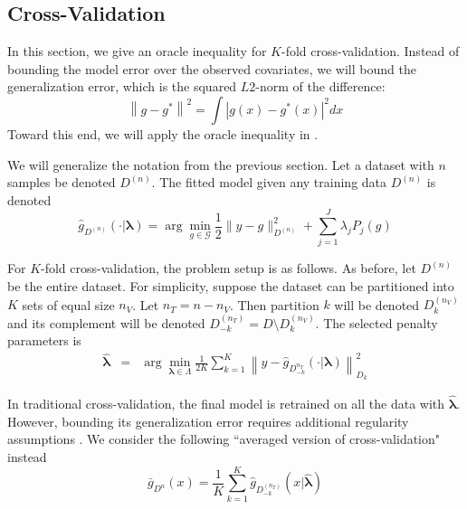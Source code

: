\documentclass[12pt]{article}
\begin{document}
\subsection{Cross-Validation}

In this section, we give an oracle inequality for $K$-fold cross-validation. Instead of bounding the model error over the observed covariates, we will bound the generalization error, which is the squared $L2$-norm of the difference:
\begin{equation}
\left \| g - g^* \right \|^2 = \int \left |g(x) - g^*(x) \right |^2 dx
\end{equation}
Toward this end, we will apply the oracle inequality in \citet{lecue2012oracle}.

We will generalize the notation from the previous section. Let a dataset with $n$ samples be denoted $D^{(n)}$. The fitted model given any training data $D^{(n)}$ is denoted
\begin{equation}
\hat{g}_{D^{(n)}}(\cdot | \boldsymbol \lambda)= \arg\min_{g\in\mathcal{G}} \frac{1}{2} \| y-g \|_{D^{(n)}}^{2} + \sum_{j=1}^J \lambda_j P_j(g)
\end{equation}

For $K$-fold cross-validation, the problem setup is as follows. As before, let $D^{(n)}$ be the entire dataset. For simplicity, suppose the dataset can be partitioned into $K$ sets of equal size $n_V$. Let $n_T = n - n_V$. Then partition $k$ will be denoted $D_k^{(n_V)}$ and its complement will be denoted $D_{-k}^{(n_T)} = D \setminus D_k^{(n_V)}$. The selected penalty parameters is
\begin{eqnarray}
\label{kfold_opt}
\hat{\boldsymbol \lambda} &=& \arg\min_{\boldsymbol{\lambda} \in\Lambda} \frac{1}{2K} \sum_{k=1}^K  \left \| y-\hat{g}_{D_{-k}^{n_T}}(\cdot | \boldsymbol \lambda) \right \|_{D_k}^{2}
\end{eqnarray}

In traditional cross-validation, the final model is retrained on all the data with $\hat{\boldsymbol{\lambda}}$. However, bounding its generalization error requires additional regularity assumptions \citep{lecue2012oracle}. We consider the following ``averaged version of cross-validation" instead
\begin{equation}
\bar{g}_{D^{n}}(x) = \frac{1}{K} \sum_{k=1}^K \hat{g}_{D^{(n_T)}_{-k}}
(x | \hat{\boldsymbol \lambda})
\end{equation}
\end{document}
